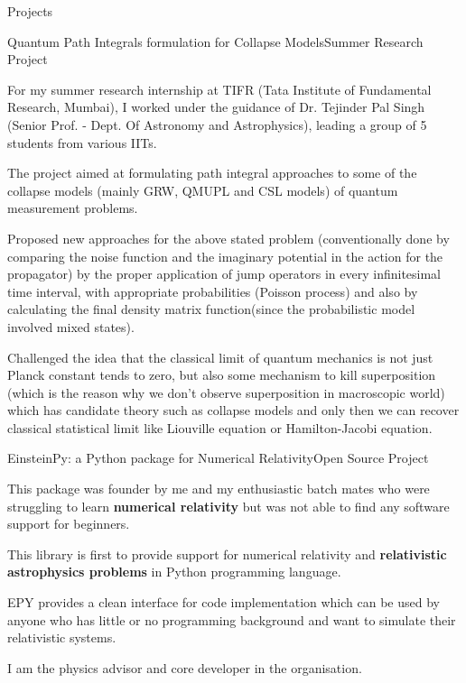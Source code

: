 \documentclass{resume} %
\begin{document}
\begin{rSection}{Projects}
\begin{rSubsection}{Quantum Path Integrals formulation for Collapse Models}{Summer Research Project}{}{}
\item For my summer research internship at TIFR (Tata Institute of Fundamental Research, Mumbai), I worked under the guidance of Dr. Tejinder Pal Singh (Senior Prof. - Dept. Of Astronomy and Astrophysics), leading a group of 5 students from various IITs.
    \item The project aimed at formulating path integral approaches to some of the collapse models (mainly GRW, QMUPL and CSL models) of quantum measurement problems.
    \item Proposed new approaches for the above stated problem (conventionally done by comparing the noise function and the imaginary potential in the action for the propagator) by the proper application of jump operators in every infinitesimal time interval, with appropriate probabilities (Poisson process) and also by calculating the final density matrix function(since the probabilistic model involved mixed states).
    \item Challenged the idea that the classical limit of quantum mechanics is not just Planck constant tends to zero, but also some mechanism to kill superposition (which is the reason why we don’t observe superposition in macroscopic world) which has candidate theory such as collapse models and only then we can recover classical statistical limit like Liouville equation or Hamilton-Jacobi equation.
\end{rSubsection}

\begin{rSubsection}{EinsteinPy: a Python package for Numerical Relativity}{Open Source Project}{}{}
\item This package was founder by me and my enthusiastic batch mates who were struggling to learn \textbf{numerical relativity} but was not able to find any software support for beginners.
\item This library is first to provide support for numerical relativity and \textbf{relativistic astrophysics problems} in Python programming language.
\item EPY provides a clean interface for code implementation which can be used by anyone who has little or no programming background and want to simulate their relativistic systems.
\item I am the physics advisor and core developer in the organisation.

\end{rSubsection}


\end{rSection}
\end{document}
